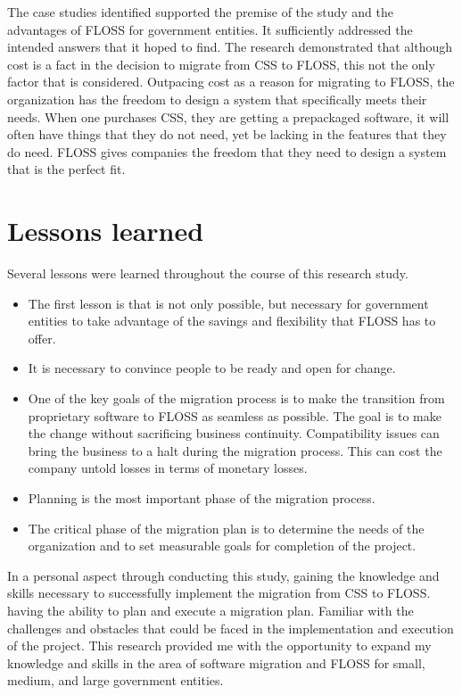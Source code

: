 The case studies identified supported the premise of the study and the advantages of FLOSS for government entities. It sufficiently addressed the intended answers that it hoped to find. The research demonstrated that although cost is a fact in the decision to migrate from CSS to FLOSS, this not the only factor that is considered. Outpacing cost as a reason for migrating to FLOSS, the organization has the freedom to design a system that specifically meets their needs. When one purchases CSS, they are getting a prepackaged  software, it will often have things that they do not need, yet be lacking in the features that they do need. FLOSS gives companies the freedom that they need to design a system that is the perfect fit.          
\section{Lessons learned}
\label{sec:lessons}
Several lessons were learned throughout the course of this research study. 
\begin{itemize}
\item  The first lesson is that is not only possible, but necessary for government entities to take advantage of the savings and flexibility that FLOSS has to offer.
\item It is necessary to convince people to be ready and open for change.
\item One of the key goals of the migration process is to make the transition from proprietary software to FLOSS as seamless as possible. The goal is to make the change without sacrificing business continuity. Compatibility issues can bring the business to a halt during the migration process. This can cost the company untold losses in terms of monetary losses.
\item Planning is the most important phase of the migration process.
\item The critical phase of the migration plan is to determine the needs of the organization and to set measurable goals for completion of the project.

\end{itemize}

In a personal aspect through conducting this study, gaining the knowledge and skills necessary to successfully implement the migration from CSS to FLOSS. having the ability to plan and execute a migration plan. Familiar with the challenges and obstacles that could be faced in the implementation and execution of the project. 
This research provided me with the opportunity to expand my knowledge and skills in the area of software migration and FLOSS for small, medium, and large government entities.
